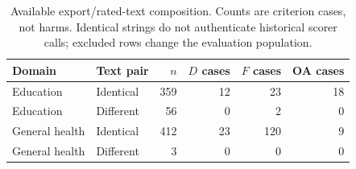 \begin{table}[t]
\centering\small
\caption{Available export/rated-text composition. Counts are criterion cases, not harms. Identical strings do not authenticate historical scorer calls; excluded rows change the evaluation population.}
\label{tab:provenance_composition}
\begin{tabular}{llrrrr}
\toprule
Domain & Text pair & $n$ & $D$ cases & $F$ cases & OA cases \\
\midrule
Education & Identical & 359 & 12 & 23 & 18 \\
Education & Different & 56 & 0 & 2 & 0 \\
General health & Identical & 412 & 23 & 120 & 9 \\
General health & Different & 3 & 0 & 0 & 0 \\
\bottomrule
\end{tabular}
\end{table}
